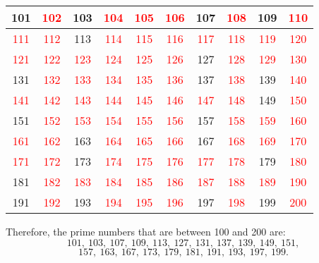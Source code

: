 \begin{solution}
\begin{center}
\begin{tabular}{ |c|c|c|c|c|c|c|c|c|c| }
        \hline
        101 & \textcolor{red}{102} & 103 & \textcolor{red}{104} & \textcolor{red}{105} & \textcolor{red}{106} & 107 & \textcolor{red}{108} & 109 & \textcolor{red}{110} \\ 
        \hline
        \textcolor{red}{111} & \textcolor{red}{112} & 113 & \textcolor{red}{114} & \textcolor{red}{115} & \textcolor{red}{116} & \textcolor{red}{117} & \textcolor{red}{118} & \textcolor{red}{119} & \textcolor{red}{120} \\ 
        \hline
        \textcolor{red}{121} & \textcolor{red}{122} & \textcolor{red}{123} & \textcolor{red}{124} & \textcolor{red}{125} & \textcolor{red}{126} & 127 & \textcolor{red}{128} & \textcolor{red}{129} & \textcolor{red}{130} \\ 
        \hline
        131 & \textcolor{red}{132} & \textcolor{red}{133} & \textcolor{red}{134} & \textcolor{red}{135} & \textcolor{red}{136} & 137 & \textcolor{red}{138} & 139 & \textcolor{red}{140} \\ 
        \hline
        \textcolor{red}{141} & \textcolor{red}{142} & \textcolor{red}{143} & \textcolor{red}{144} & \textcolor{red}{145} & \textcolor{red}{146} & \textcolor{red}{147} & \textcolor{red}{148} & 149 & \textcolor{red}{150} \\ 
        \hline
        151 & \textcolor{red}{152} & \textcolor{red}{153} & \textcolor{red}{154} & \textcolor{red}{155} & \textcolor{red}{156} & 157 & \textcolor{red}{158} & \textcolor{red}{159} & \textcolor{red}{160} \\ 
        \hline
        \textcolor{red}{161} & \textcolor{red}{162} & 163 & \textcolor{red}{164} & \textcolor{red}{165} & \textcolor{red}{166} & 167 & \textcolor{red}{168} & \textcolor{red}{169} & \textcolor{red}{170} \\ 
        \hline
        \textcolor{red}{171} & \textcolor{red}{172} & 173 & \textcolor{red}{174} & \textcolor{red}{175} & \textcolor{red}{176} & \textcolor{red}{177} & \textcolor{red}{178} & 179 & \textcolor{red}{180} \\
        \hline
        181 & \textcolor{red}{182} & \textcolor{red}{183} & \textcolor{red}{184} & \textcolor{red}{185} & \textcolor{red}{186} & \textcolor{red}{187} & \textcolor{red}{188} & \textcolor{red}{189} & \textcolor{red}{190} \\ 
        \hline
        191 & \textcolor{red}{192} & 193 & \textcolor{red}{194} & \textcolor{red}{195} & \textcolor{red}{196} & 197 & \textcolor{red}{198} & 199 & \textcolor{red}{200} \\ 
        \hline
    \end{tabular}
    \end{center}

    Therefore, the prime numbers that are between 100 and 200 are:
    $$101, \ 103, \ 107, \ 109, \ 113, \ 127, \ 131, \ 137, \ 139, \ 149, \ 151,$$
    $$157, \ 163, \ 167, \ 173, \ 179, \ 181, \ 191, \ 193, \ 197, \ 199.$$
\end{solution}

